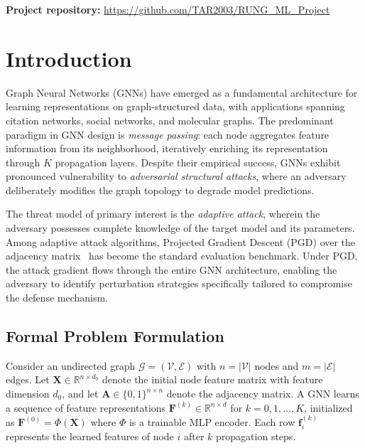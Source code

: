 \documentclass[sigconf]{acmart}
\begin{document}
\maketitle

\noindent\textbf{Project repository:} \url{https://github.com/TAR2003/RUNG_ML_Project}

\section{Introduction}

Graph Neural Networks (GNNs) have emerged as a fundamental architecture for learning representations on graph-structured data, with applications spanning citation networks, social networks, and molecular graphs. The predominant paradigm in GNN design is \emph{message passing}: each node aggregates feature information from its neighborhood, iteratively enriching its representation through $K$ propagation layers. Despite their empirical success, GNNs exhibit pronounced vulnerability to \emph{adversarial structural attacks}, where an adversary deliberately modifies the graph topology to degrade model predictions.

The threat model of primary interest is the \emph{adaptive attack}, wherein the adversary possesses complete knowledge of the target model and its parameters. Among adaptive attack algorithms, Projected Gradient Descent (PGD) over the adjacency matrix~\cite{xu2019pgd} has become the standard evaluation benchmark. Under PGD, the attack gradient flows through the entire GNN architecture, enabling the adversary to identify perturbation strategies specifically tailored to compromise the defense mechanism.

\subsection{Formal Problem Formulation}

Consider an undirected graph $\mathcal{G} = (\mathcal{V}, \mathcal{E})$ with $n = |\mathcal{V}|$ nodes and $m = |\mathcal{E}|$ edges. Let $\mathbf{X} \in \mathbb{R}^{n \times d_0}$ denote the initial node feature matrix with feature dimension $d_0$, and let $\mathbf{A} \in \{0,1\}^{n \times n}$ denote the adjacency matrix. A GNN learns a sequence of feature representations $\mathbf{F}^{(k)} \in \mathbb{R}^{n \times d}$ for $k = 0, 1, \ldots, K$, initialized as $\mathbf{F}^{(0)} = \Phi(\mathbf{X})$ where $\Phi$ is a trainable MLP encoder. Each row $\mathbf{f}_i^{(k)}$ represents the learned features of node $i$ after $k$ propagation steps.
\end{document}
